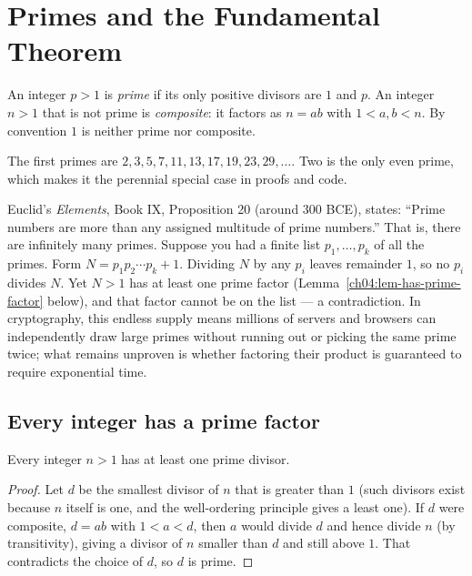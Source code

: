 \section{Primes and the Fundamental Theorem}
\label{ch04:primes}

\begin{definition}
\label{ch04:def-prime}
An integer $p > 1$ is \emph{prime} if its only positive divisors are $1$ and $p$. An integer
$n > 1$ that is not prime is \emph{composite}: it factors as $n = ab$ with $1 < a, b < n$. By
convention $1$ is neither prime nor composite.
\end{definition}

The first primes are $2, 3, 5, 7, 11, 13, 17, 19, 23, 29, \dots$. Two is the only even prime, which
makes it the perennial special case in proofs and code.

\begin{historybox}
Euclid's \emph{Elements}, Book IX, Proposition 20 (around 300 BCE), states: ``Prime numbers are more than any assigned multitude of prime numbers.'' That is, there are infinitely many primes. Suppose you had a finite list $p_1, \dots, p_k$ of all the primes. Form $N = p_1 p_2 \cdots p_k + 1$. Dividing $N$ by any $p_i$ leaves remainder $1$, so no $p_i$ divides $N$. Yet $N > 1$ has at least one prime factor (Lemma~\ref{ch04:lem-has-prime-factor} below), and that factor cannot be on the list --- a contradiction. In cryptography, this endless supply means millions of servers and browsers can independently draw large primes without running out or picking the same prime twice; what remains unproven is whether factoring their product is guaranteed to require exponential time.
\end{historybox}

\subsection*{Every integer has a prime factor}

\begin{lemma}
\label{ch04:lem-has-prime-factor}
Every integer $n > 1$ has at least one prime divisor.
\end{lemma}

\begin{proof}
Let $d$ be the smallest divisor of $n$ that is greater than $1$ (such divisors exist because $n$
itself is one, and the well-ordering principle gives a least one). If $d$ were composite, $d = ab$
with $1 < a < d$, then $a$ would divide $d$ and hence divide $n$ (by transitivity), giving a divisor
of $n$ smaller than $d$ and still above $1$. That contradicts the choice of $d$, so $d$ is prime.
\end{proof}

